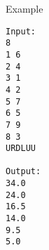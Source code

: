 Example
\begin{verbatim}
Input:
8
1 6
2 4
3 1
4 2
5 7
6 5
7 9
8 3
URDLUU

Output:
34.0
24.0
16.5
14.0
9.5
5.0
\end{verbatim}